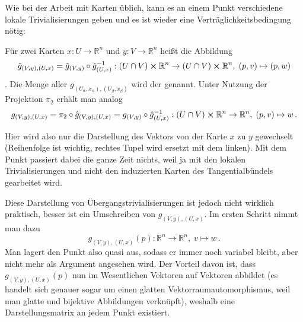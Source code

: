 \documentclass[../H_Analysis_main.tex]{subfiles}
\begin{document}
Wie bei der Arbeit mit Karten üblich, kann es an einem Punkt verschiedene lokale Trivialisierungen geben und es ist wieder eine Verträglichkeitsbedingung nötig:
\begin{defi}[Kozyklus]
Für zwei Karten $x: U \rightarrow \mathbb{R}^n$ und $y: V \rightarrow \mathbb{R}^n$ heißt die Abbildung
\begin{equation}
\hat{g}_{(V, y), (U, x)} = \hat{g}_{(V, y)} \circ \hat{g}_{(U, x)}^{-1}: (U \cap V) \cross \mathbb{R}^n \rightarrow (U \cap V) \cross \mathbb{R}^n, \; (p, v) \mapsto (p, w)
\end{equation}
. Die Menge aller $g_{(U_\alpha, x_\alpha), (U_\beta, x_\beta)}$ wird der  genannt. Unter Nutzung der Projektion $\pi_2$ erhält man analog
\begin{equation}
g_{(V, y), (U, x)} = \pi_2 \circ \hat{g}_{(V, y), (U, x)} = g_{(V, y)} \circ \hat{g}_{(U, x)}^{-1}: (U \cap V) \cross \mathbb{R}^n \rightarrow \mathbb{R}^n, \; (p, v) \mapsto w \, .
\end{equation}
\end{defi}

Hier wird also nur die Darstellung des Vektors von der Karte $x$ zu $y$ gewechselt (Reihenfolge ist wichtig, rechtes Tupel wird ersetzt mit dem linken). Mit dem Punkt passiert dabei die ganze Zeit nichts, weil ja mit den lokalen Trivialisierungen und nicht den induzierten Karten des Tangentialbündels gearbeitet wird. 

Diese Darstellung von Übergangstrivialisierungen ist jedoch nicht wirklich praktisch, besser ist ein Umschreiben von $g_{(V, y), (U, x)}$. Im ersten Schritt nimmt man dazu
\begin{equation}\label{eq:uebergangtriv1}
g_{(V, y), (U, x)}(p): \mathbb{R}^n \rightarrow \mathbb{R}^n, \; v \mapsto w \, .
\end{equation}
Man lagert den Punkt also quasi aus, sodass er immer noch variabel bleibt, aber nicht mehr als Argument angesehen wird. Der Vorteil davon ist, dass $g_{(V, y), (U, x)}(p)$ nun im Wesentlichen Vektoren auf Vektoren abbildet (es handelt sich genauer sogar um einen glatten Vektorraumautomorphismus, weil man glatte und bijektive Abbildungen verknüpft), weshalb eine Darstellungsmatrix an jedem Punkt existiert.
\end{document}
